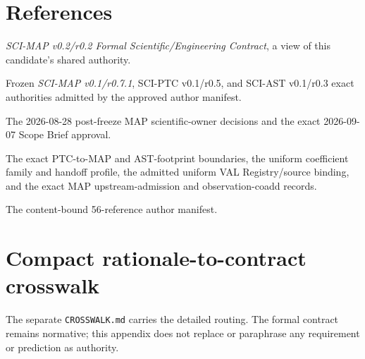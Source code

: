 \documentclass[10pt]{article}
\newcommand{\code}[1]{\nolinkurl{#1}}
\begin{document}
\section*{References}
\begin{enumerate}[label={[\arabic*]},leftmargin=*]
\item \emph{SCI-MAP v0.2/r0.2 Formal Scientific/Engineering Contract}, a view of this candidate's shared authority.
\item Frozen \emph{SCI-MAP v0.1/r0.7.1}, SCI-PTC v0.1/r0.5, and SCI-AST v0.1/r0.3 exact authorities admitted by the approved author manifest.
\item The 2026-08-28 post-freeze MAP scientific-owner decisions and the exact 2026-09-07 Scope Brief approval.
\item The exact PTC-to-MAP and AST-footprint boundaries, the uniform
coefficient family and handoff profile, the admitted uniform VAL
Registry/source binding, and the exact MAP upstream-admission and
observation-coadd records.
\item The content-bound 56-reference author manifest.
\end{enumerate}

\clearpage\appendix
\section{Compact rationale-to-contract crosswalk}\label{app:crosswalk}
The separate \code{CROSSWALK.md} carries the detailed
routing. The formal contract remains normative; this appendix does not replace
or paraphrase any requirement or prediction as authority.
\end{document}
